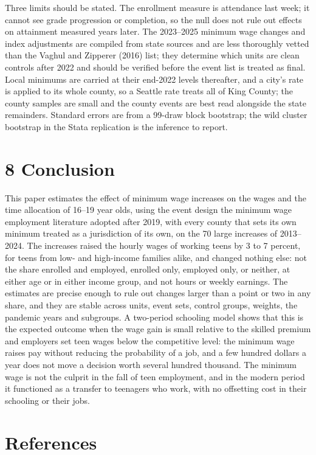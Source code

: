 \documentclass[12pt]{article}
\begin{document}
Three limits should be stated. The enrollment measure is attendance last week; it cannot see grade progression or completion, so the null does not rule out effects on attainment measured years later. The 2023--2025 minimum wage changes and index adjustments are compiled from state sources and are less thoroughly vetted than the Vaghul and Zipperer (2016) list; they determine which units are clean controls after 2022 and should be verified before the event list is treated as final. Local minimums are carried at their end-2022 levels thereafter, and a city's rate is applied to its whole county, so a Seattle rate treats all of King County; the county samples are small and the county events are best read alongside the state remainders. Standard errors are from a 99-draw block bootstrap; the wild cluster bootstrap in the Stata replication is the inference to report.

\section{8 Conclusion}

This paper estimates the effect of minimum wage increases on the wages and the time allocation of 16--19 year olds, using the event design the minimum wage employment literature adopted after 2019, with every county that sets its own minimum treated as a jurisdiction of its own, on the 70 large increases of 2013--2024. The increases raised the hourly wages of working teens by 3 to 7 percent, for teens from low- and high-income families alike, and changed nothing else: not the share enrolled and employed, enrolled only, employed only, or neither, at either age or in either income group, and not hours or weekly earnings. The estimates are precise enough to rule out changes larger than a point or two in any share, and they are stable across units, event sets, control groups, weights, the pandemic years and subgroups. A two-period schooling model shows that this is the expected outcome when the wage gain is small relative to the skilled premium and employers set teen wages below the competitive level: the minimum wage raises pay without reducing the probability of a job, and a few hundred dollars a year does not move a decision worth several hundred thousand. The minimum wage is not the culprit in the fall of teen employment, and in the modern period it functioned as a transfer to teenagers who work, with no offsetting cost in their schooling or their jobs.



\section*{References}
\end{document}
